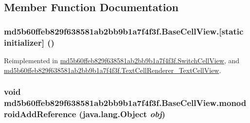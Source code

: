 \subsection{Member Function Documentation}
\hypertarget{classmd5b60ffeb829f638581ab2bb9b1a7f4f3f_1_1_base_cell_view_f945c6cd310f27f3f6ed7c0198a20d8c}{
\subsubsection[{[static initializer]}]{\setlength{\rightskip}{0pt plus 5cm}md5b60ffeb829f638581ab2bb9b1a7f4f3f.BaseCellView.\mbox{[}static initializer\mbox{]} ()}}
\label{classmd5b60ffeb829f638581ab2bb9b1a7f4f3f_1_1_base_cell_view_f945c6cd310f27f3f6ed7c0198a20d8c}




Reimplemented in \hyperlink{classmd5b60ffeb829f638581ab2bb9b1a7f4f3f_1_1_switch_cell_view_b1715a4890387a38bb406c97d7c77468}{md5b60ffeb829f638581ab2bb9b1a7f4f3f.SwitchCellView}, and \hyperlink{classmd5b60ffeb829f638581ab2bb9b1a7f4f3f_1_1_text_cell_renderer___text_cell_view_99fc1adaf6ba874322d45cb6ab9ce84c}{md5b60ffeb829f638581ab2bb9b1a7f4f3f.TextCellRenderer\_\-TextCellView}.\hypertarget{classmd5b60ffeb829f638581ab2bb9b1a7f4f3f_1_1_base_cell_view_7064411ae8713f07abf9855828ab5d7a}{
\subsubsection[{monodroidAddReference}]{\setlength{\rightskip}{0pt plus 5cm}void md5b60ffeb829f638581ab2bb9b1a7f4f3f.BaseCellView.monodroidAddReference (java.lang.Object {\em obj})}}
\label{classmd5b60ffeb829f638581ab2bb9b1a7f4f3f_1_1_base_cell_view_7064411ae8713f07abf9855828ab5d7a}




